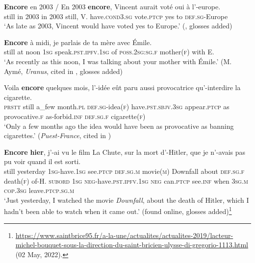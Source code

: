 \begin{exe}
	\ex\label{exAppendixFrenchEncoreTimeScalar1}
	 \gll \textbf{Encore} en 2003 / En 2003 \textbf{encore}, Vincent aurait voté oui à l'-europe.\\
	still in 2003 {} in 2003 still, V. have.\textsc{cond}3.\textsc{sg} vote.\textsc{ptcp} yes to \textsc{def}.\textsc{sg}-Europe\\
	\glt \lq As late as 2003, Vincent would have voted yes to Europe.\rq{ }(\cite[160–161]{MosegaardHansen2008}, glosses added)
	
	\ex\label{exAppendixFrenchEncoreTimeScalar2}
	\gll \textbf{Encore} à midi, je parlais de ta mère avec Émile.\\
	still at noon 1\textsc{sg} speak.\textsc{pst}.\textsc{ipfv}.1\textsc{sg} of \textsc{poss}.2\textsc{sg}:\textsc{sg}.\textsc{f} mother(\textsc{f}) with E.\\
	\glt \lq As recently as this noon, I was talking about your mother with Émile.' (M. Aymé, \textit{Uranus}, cited in \cite[259]{Fuchs1993}, glosses added)
	

	\ex\label{exAppendixFrenchEncoreTimeScalar4}
	 \gll Voila \textbf{encore} quelques mois, l'-idée eût paru aussi provocatrice qu’-interdire la cigarette.\\
	\textsc{prstt} still a\_few month.\textsc{pl} \textsc{def}.\textsc{sg}-idea(\textsc{f}) have.\textsc{pst}.\textsc{sbjv}.3\textsc{sg} appear.\textsc{ptcp} as provocative.\textsc{f} as-forbid.\textsc{inf} \textsc{def}.\textsc{sg}.\textsc{f} cigarette(\textsc{f})\\
	\glt \lq Only a few months ago the idea would have been as provocative as banning cigarettes.' (\textit{Puest-France}, cited in \cite[258]{Fuchs1993})
	
	\ex\label{exAppendixFrenchEncoreTimeScalar5}
\gll \textbf{Encore} \textbf{hier}, j'-ai vu le film {La Chute}, sur la mort d’-Hitler, que je n’-avais pas pu voir quand il est sorti.\\
	still yesterday 1\textsc{sg}-have.1\textsc{sg} see.\textsc{ptcp} \textsc{def}.\textsc{sg}.\textsc{m} movie(\textsc{m}) Downfall about \textsc{def}.\textsc{sg}.\textsc{f} death(\textsc{f}) of-H. \textsc{subord} 1\textsc{sg} \textsc{neg}-have.\textsc{pst}.\textsc{ipfv}.1\textsc{sg} \textsc{neg} can.\textsc{ptcp} see.\textsc{inf} when 3\textsc{sg}.\textsc{m} \textsc{cop}.3\textsc{sg} leave.\textsc{ptcp}.\textsc{sg}.\textsc{m}\\
	\glt \lq Just yesterday, I watched the movie \textit{Downfall}, about the death of Hitler, which I hadn't been able to watch when it came out.\rq{ }(found online, glosses added)\footnote{\url{https://www.saintbrice95.fr/a-la-une/actualites/actualites-2019/lacteur-michel-bouquet-sous-la-direction-du-saint-bricien-ulysse-di-gregorio-1113.html} (02 May, 2022).}
\end{exe}


